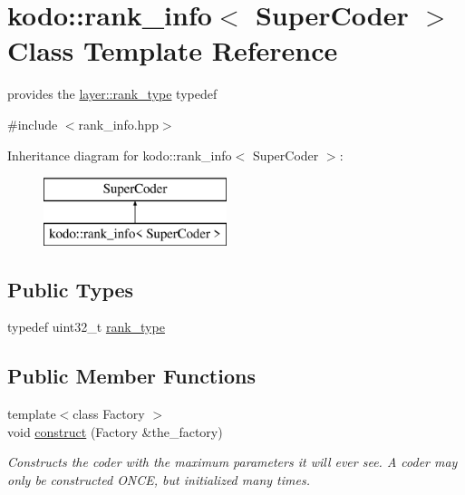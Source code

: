 \hypertarget{classkodo_1_1rank__info}{\section{kodo\-:\-:rank\-\_\-info$<$ Super\-Coder $>$ Class Template Reference}
\label{classkodo_1_1rank__info}
}


provides the \hyperlink{classlayer_a1de820b75c9af3faf024dee2b22599e4}{layer\-::rank\-\_\-type} typedef  




{\ttfamily \#include $<$rank\-\_\-info.\-hpp$>$}

Inheritance diagram for kodo\-:\-:rank\-\_\-info$<$ Super\-Coder $>$\-:\begin{figure}[H]
\begin{center}
\leavevmode
\includegraphics[height=2.000000cm]{classkodo_1_1rank__info}
\end{center}
\end{figure}
\subsection*{Public Types}
\begin{DoxyCompactItemize}
\item 
typedef uint32\-\_\-t \hyperlink{classkodo_1_1rank__info_a12ba3fbad23b26891e45ba55b48a1073}{rank\-\_\-type}
\begin{DoxyCompactList}\small\item\em \end{DoxyCompactList}\end{DoxyCompactItemize}
\subsection*{Public Member Functions}
\begin{DoxyCompactItemize}
\item 
{\footnotesize template$<$class Factory $>$ }\\void \hyperlink{classkodo_1_1rank__info_a0e9487a0fe9ef1de082e237e2142f6ab}{construct} (Factory \&the\-\_\-factory)
\begin{DoxyCompactList}\small\item\em Constructs the coder with the maximum parameters it will ever see. A coder may only be constructed O\-N\-C\-E, but initialized many times. \end{DoxyCompactList}\end{DoxyCompactItemize}


